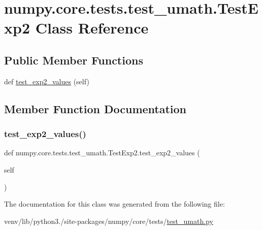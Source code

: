\hypertarget{classnumpy_1_1core_1_1tests_1_1test__umath_1_1TestExp2}{}\section{numpy.\+core.\+tests.\+test\+\_\+umath.\+Test\+Exp2 Class Reference}
\label{classnumpy_1_1core_1_1tests_1_1test__umath_1_1TestExp2}
\subsection*{Public Member Functions}
\begin{DoxyCompactItemize}
\item 
def \hyperlink{classnumpy_1_1core_1_1tests_1_1test__umath_1_1TestExp2_a1d83fdeb533eab2c6cc3f86183417be9}{test\+\_\+exp2\+\_\+values} (self)
\end{DoxyCompactItemize}


\subsection{Member Function Documentation}
\mbox{\label{classnumpy_1_1core_1_1tests_1_1test__umath_1_1TestExp2_a1d83fdeb533eab2c6cc3f86183417be9}} 
\subsubsection{\texorpdfstring{test\+\_\+exp2\+\_\+values()}{test\_exp2\_values()}}
{\footnotesize\ttfamily def numpy.\+core.\+tests.\+test\+\_\+umath.\+Test\+Exp2.\+test\+\_\+exp2\+\_\+values (\begin{DoxyParamCaption}\item[{}]{self }\end{DoxyParamCaption})}



The documentation for this class was generated from the following file\+:\begin{DoxyCompactItemize}
\item 
venv/lib/python3./site-\/packages/numpy/core/tests/\hyperlink{test__umath_8py}{test\+\_\+umath.\+py}\end{DoxyCompactItemize}
